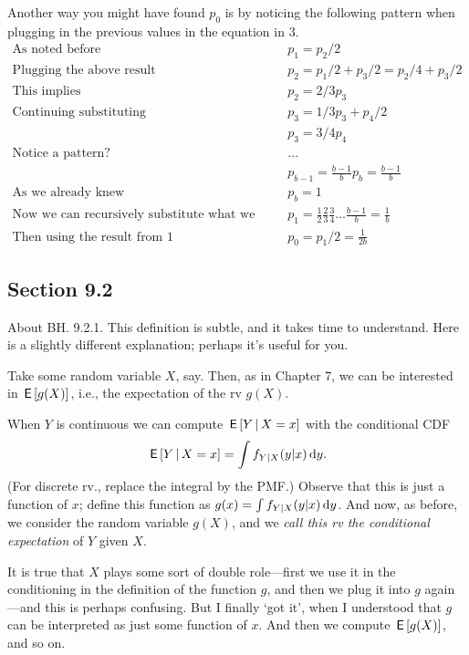 \begin{exercise}
\begin{solution}
  Another way you might have found $p_0$ is by noticing the following pattern when plugging in the previous values in the equation in $3$.
\begin{align*}
\textrm{As noted before } \quad & p_1 = p_2/2 \\
\textrm{Plugging the above result } \quad & p_2 = p_1/2 + p_3/2 = p_2/4 + p_3/2 \\
  \textrm{This implies } \quad & p_2 = 2/3 p_3 \\
  \textrm{Continuing substituting } \quad & p_3 = 1/3 p_3 + p_4 / 2\\
  & p_3 = 3/4 p_4 \\
  \textrm{Notice a pattern? } \quad & \dots \\
  & p_{b-1} = \frac{b-1}{b} p_b = \frac{b-1}{b}\\
  \textrm{As we already knew} \quad & p_b = 1 \\
\textrm{Now we can recursively substitute what we know to find } \quad & p_1 = \frac{1}{2} \frac{2}{3} \frac{3}{4} \dots \frac{b-1}{b} = \frac{1}{b} \\
\textrm{Then using the result from $1$} \quad & p_0 = p_1/2 = \frac{1}{2b}
\end{align*}
\end{solution}
\end{exercise}



\subsection*{Section 9.2}
\label{sec:section-9.2}

\begin{remark} About BH. 9.2.1. This definition is subtle, and it takes time to understand.
Here is a slightly different explanation; perhaps it's useful for you.

Take some random variable $X$, say.
Then, as in Chapter 7,  we can be interested in  $\,\mathsf{E}\left[g(X)\right]$, i.e., the expectation of the rv $g(X)$.

When $Y$ is continuous we can compute $\,\mathsf{E}\left[Y \,\middle|\, X=x\right]$ with  the conditional CDF
\begin{align*}
\,\mathsf{E}\left[Y\,\middle|\, X=x \right] =\int f_{Y| X}(y | x) \,\textrm{d}y.
\end{align*}
(For discrete rv., replace the integral by the PMF.)
Observe that this is just a function of $x$; define this function as $g(x) = \int f_{Y| X}(y | x)\,\textrm{d}y$. And now, as before, we consider the random variable $g(X)$, and we  \emph{call this rv the conditional expectation} of $Y$ given $X$.

It is true that $X$ plays some sort of double role---first we use it in the conditioning in the definition of the function $g$, and then we plug it into  $g$ again---and this is perhaps confusing. But I finally `got  it', when I understood that $g$ can be interpreted as just some function of $x$. And then we compute $\,\mathsf{E}\left[g(X)\right]$, and so on.
\end{remark}



